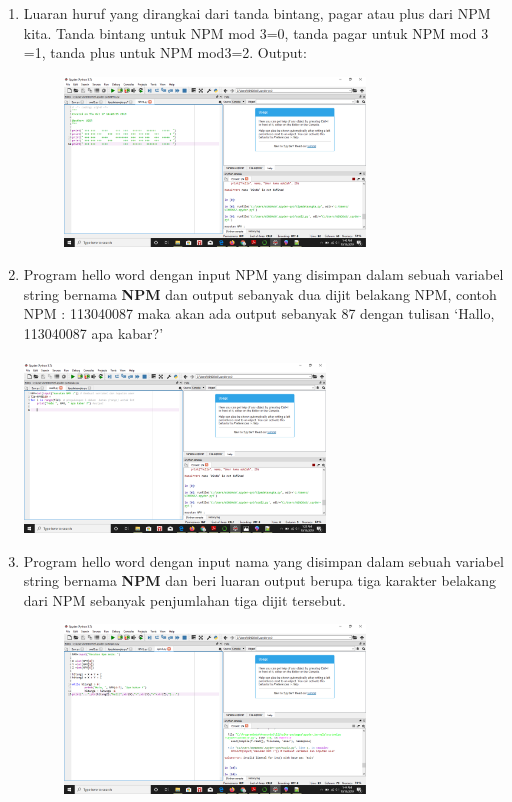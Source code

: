 \begin{enumerate}
\item
Luaran huruf yang dirangkai dari tanda bintang, pagar atau plus dari NPM kita.
Tanda bintang untuk NPM mod 3=0, tanda pagar untuk NPM mod 3 =1, tanda plus untuk NPM mod3=2.
Output:
\begin{figure}[h]
\centerline{\includegraphics[width=8cm]{gambar/NPM1.png}}
\end{figure}


\item
Program hello word dengan input NPM yang disimpan dalam sebuah variabel string bernama \textbf{NPM} dan output sebanyak dua dijit belakang NPM, 
contoh NPM : 113040087 maka akan ada output sebanyak 87 dengan tulisan `Hallo, 113040087 apa kabar?'
\paragraph{}
\centerline{\includegraphics[width=8cm]{gambar/soal2.png}}


\item
Program hello word dengan input nama yang disimpan dalam sebuah variabel string bernama \textbf{NPM} dan beri luaran output berupa tiga karakter belakang dari NPM sebanyak penjumlahan tiga dijit tersebut.
\begin{figure}[h]
\centerline{\includegraphics[width=8cm]{gambar/npm3.png}}
\end{figure}



\end{enumerate}
